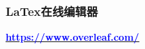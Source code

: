 \begin{frame}[fragile]
\frametitle{LaTex在线编辑器}
\underline{\Huge \textbf{\href{https://www.overleaf.com/}{\textcolor{blue}{https://www.overleaf.com/}}}}
\end{frame}
